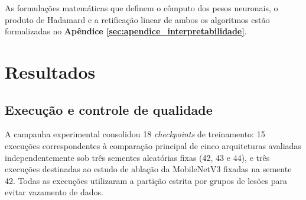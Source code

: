 \documentclass[oneside,english,brazilian]{UNISINOSmonografia}
\begin{document}
As formulações matemáticas que definem o cômputo dos pesos neuronais, o produto de Hadamard e a retificação linear de ambos os algoritmos estão formalizadas no \textbf{Apêndice \ref{sec:apendice_interpretabilidade}}.





\chapter{Resultados}

\section{Execução e controle de qualidade}

A campanha experimental consolidou 18 \textit{checkpoints} de treinamento: 15 execuções correspondentes à comparação principal de cinco arquiteturas avaliadas independentemente sob três sementes aleatórias fixas (42, 43 e 44), e três execuções destinadas ao estudo de ablação da MobileNetV3 fixadas na semente 42. Todas as execuções utilizaram a partição estrita por grupos de lesões para evitar vazamento de dados.
\end{document}
